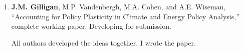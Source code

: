 %
%
\begin{enumerate}
    \item
    \textbf{J.M. Gilligan}, M.P. Vandenbergh, M.A. Cohen, and A.E. Wiseman,
    ``Accounting for Policy Plasticity in Climate and Energy Policy Analysis,''
    complete working paper.
    Developing for submission.
    \begin{credit}
        All authors developed the ideas together. I wrote the paper.
    \end{credit}
%
\end{enumerate}
